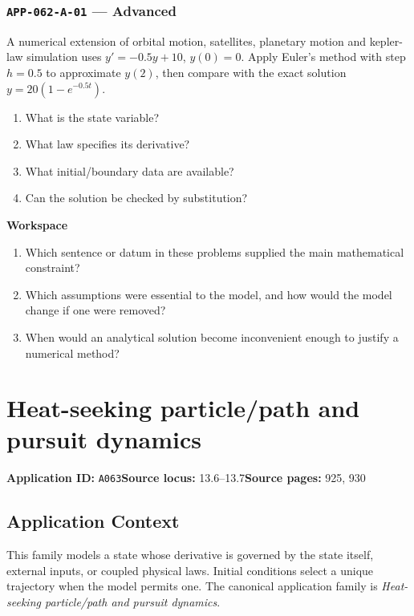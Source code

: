 \documentclass[11pt]{book}
\newcommand{\pid}[1]{\texttt{#1}}
\newcommand{\workspace}{\par\vspace{0.7in}\hrulefill\par\vspace{0.55in}\hrulefill\par}
\begin{document}
\subsection*{\pid{APP-062-A-01} — Advanced}
\begin{problembox}
A numerical extension of orbital motion, satellites, planetary motion and kepler-law simulation uses $y'=-0.5y+10$, $y(0)=0$. Apply Euler's method with step $h=0.5$ to approximate $y(2)$, then compare with the exact solution $y=20(1-e^{-0.5t})$.
\end{problembox}
\begin{promptbox}\begin{enumerate}
\item What is the state variable?
\item What law specifies its derivative?
\item What initial/boundary data are available?
\item Can the solution be checked by substitution?
\end{enumerate}\end{promptbox}
\textbf{Workspace}\workspace
\begin{reflectionbox}\begin{enumerate}
\item Which sentence or datum in these problems supplied the main mathematical constraint?
\item Which assumptions were essential to the model, and how would the model change if one were removed?
\item When would an analytical solution become inconvenient enough to justify a numerical method?
\end{enumerate}\end{reflectionbox}
\chapter{Heat-seeking particle/path and pursuit dynamics}\label{app:A063}
\textbf{Application ID:} \pid{A063}\quad \textbf{Source locus:} 13.6–13.7\quad \textbf{Source pages:} 925, 930
\section*{Application Context}
This family models a state whose derivative is governed by the state itself, external inputs, or coupled physical laws. Initial conditions select a unique trajectory when the model permits one. The canonical application family is \emph{Heat-seeking particle/path and pursuit dynamics}.
\end{document}
